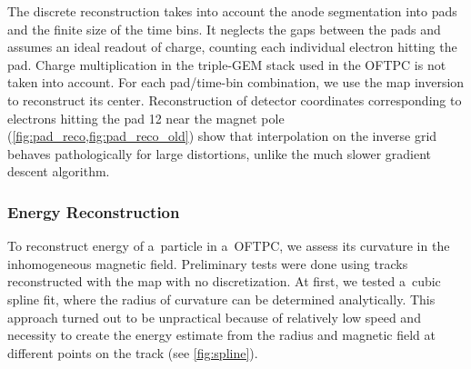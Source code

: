 		The discrete reconstruction takes into account the anode segmentation into pads and the finite size of the time bins. It neglects the gaps between the pads and assumes an ideal readout of charge, counting each individual electron hitting the pad. Charge multiplication in the triple-\ac{GEM} stack used in the \ac{OFTPC} is not taken into account. For each pad/time-bin combination, we use the map inversion to reconstruct its center. Reconstruction of detector coordinates corresponding to electrons hitting the pad 12 near the magnet pole (\cref{fig:pad_reco,fig:pad_reco_old}) show that interpolation on the inverse grid behaves pathologically for large distortions, unlike the much slower gradient descent algorithm.
		
	\subsubsection*{Energy Reconstruction}
		To reconstruct energy of a~particle in a~\ac{OFTPC}, we assess its curvature in the inhomogeneous magnetic field. Preliminary tests were done using tracks reconstructed with the map with no discretization. At first, we tested a~cubic spline fit, where the radius of curvature can be determined analytically. This approach turned out to be unpractical because of relatively low speed and necessity to create the energy estimate from the radius and magnetic field at different points on the track (see \cref{fig:spline}).
		
